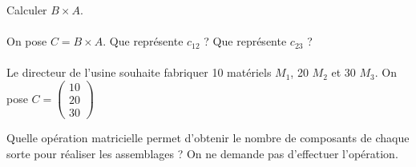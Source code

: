 \documentclass[a4paper,10pt]{article}
\begin{document}
Calculer $B\times A$.\\

\\

On pose $C=B\times A$. Que représente $c_{12}$ ? Que représente $c_{23}$ ?\\

\\

Le directeur de l'usine souhaite fabriquer 10 matériels $M_1$, 20 $M_2$ et 30 $M_3$. On pose $C = \begin{pmatrix}
10\\20\\30
\end{pmatrix}$

Quelle opération matricielle permet d'obtenir le nombre de composants de chaque sorte pour réaliser les assemblages ? On ne demande pas d'effectuer l'opération.\\

\end{document}
